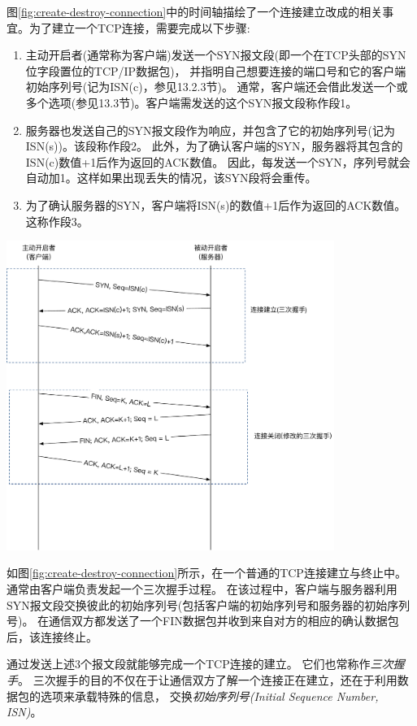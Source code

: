 \documentclass{../main.tex}{subfiles}
\begin{document}
图\ref{fig:create-destroy-connection}中的时间轴描绘了一个连接建立改成的相关事宜。为了建立一个TCP连接，需要完成以下步骤:
\begin{enumerate}
  \item 主动开启者(通常称为客户端)发送一个SYN报文段(即一个在TCP头部的SYN位字段置位的TCP/IP数据包)，
    并指明自己想要连接的端口号和它的客户端初始序列号(记为ISN(c)，参见13.2.3节)。
    通常，客户端还会借此发送一个或多个选项(参见13.3节)。客户端需发送的这个SYN报文段称作段1。
  \item 服务器也发送自己的SYN报文段作为响应，并包含了它的初始序列号(记为ISN(s))。该段称作段2。
    此外，为了确认客户端的SYN，服务器将其包含的ISN(c)数值+1后作为返回的ACK数值。
    因此，每发送一个SYN，序列号就会自动加1。这样如果出现丢失的情况，该SYN段将会重传。
  \item 为了确认服务器的SYN，客户端将ISN(s)的数值+1后作为返回的ACK数值。这称作段3。
\end{enumerate}
\begin{center}
  \includegraphics[width=0.8\textwidth]{res/cs/net/images/create-destroy-connection.pdf}
  \label{fig:create-destroy-connection}
\end{center}

如图\ref{fig:create-destroy-connection}所示，在一个普通的TCP连接建立与终止中。
通常由客户端负责发起一个三次握手过程。
在该过程中，客户端与服务器利用SYN报文段交换彼此的初始序列号(包括客户端的初始序列号和服务器的初始序列号)。
在通信双方都发送了一个FIN数据包并收到来自对方的相应的确认数据包后，该连接终止。

通过发送上述3个报文段就能够完成一个TCP连接的建立。
它们也常称作\emph{三次握手}。
三次握手的目的不仅在于让通信双方了解一个连接正在建立，还在于利用数据包的选项来承载特殊的信息，
交换\emph{初始序列号(Initial Sequence Number, ISN)}。
\end{document}
